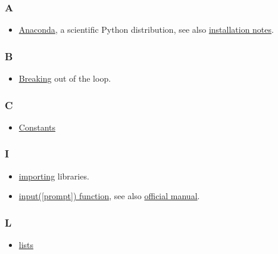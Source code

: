 \documentclass[
]{book}
\providecommand{\tightlist}{%
  \setlength{\itemsep}{0pt}\setlength{\parskip}{0pt}}
\begin{document}
\hypertarget{a}{%
\subsubsection*{A}\label{a}}

\begin{itemize}
\tightlist
\item
  \href{https://www.anaconda.com}{Anaconda}, a scientific Python distribution, see also \protect\hyperlink{install-anaconda}{installation notes}.
\end{itemize}

\hypertarget{b}{%
\subsubsection*{B}\label{b}}

\begin{itemize}
\tightlist
\item
  \protect\hyperlink{break}{Breaking} out of the loop.
\end{itemize}

\hypertarget{c}{%
\subsubsection*{C}\label{c}}

\begin{itemize}
\tightlist
\item
  \protect\hyperlink{constants}{Constants}
\end{itemize}

\hypertarget{i}{%
\subsubsection*{I}\label{i}}

\begin{itemize}
\tightlist
\item
  \protect\hyperlink{import}{importing} libraries.
\item
  \protect\hyperlink{input-function}{input({[}prompt{]}) function}, see also \href{https://docs.python.org/3/library/functions.html\#input}{official manual}.
\end{itemize}

\hypertarget{l}{%
\subsubsection*{L}\label{l}}

\begin{itemize}
\tightlist
\item
  \protect\hyperlink{lists}{lists}
\end{itemize}
\end{document}
